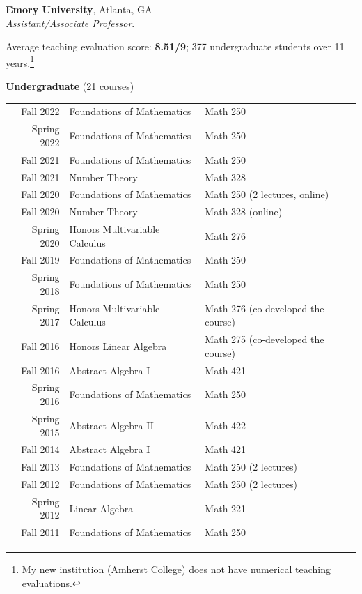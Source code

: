 \documentclass[margin,line]{res}
\newcommand{\defi}[1]{\textsf{#1}} 				%
\begin{document}
\begin{resume}
{\bf Emory University}, Atlanta, GA\\
\emph{Assistant/Associate Professor}. 
\vspace{2pt}

Average teaching evaluation score: \textbf{8.51/9}; 377 undergraduate students over 11 years.\footnote{My new institution (Amherst College) does not have numerical teaching evaluations.} 
\vspace{2pt}



{\bf Undergraduate} (21 courses)
\vspace*{-.1in}

\begin{tabular}{rll}
 Fall 2022 & \defi{Foundations of Mathematics} & Math 250\\  
 Spring 2022 & \defi{Foundations of Mathematics} & Math 250\\
 Fall 2021 & \defi{Foundations of Mathematics} & Math 250  \\
 Fall 2021 & \defi{Number Theory} & Math 328   \\   
 Fall 2020 & \defi{Foundations of Mathematics} & Math 250 (2 lectures, online) \\
 Fall 2020 & \defi{Number Theory} & Math 328 (online)  \\    
 Spring 2020 & \defi{Honors Multivariable Calculus} & Math 276 \\
 Fall 2019 & \defi{Foundations of Mathematics} & Math 250 \\
 Spring 2018 & \defi{Foundations of Mathematics} & Math 250 \\
 Spring 2017 & \defi{Honors Multivariable Calculus} & Math 276  (co-developed the course) \\
 Fall 2016 & \defi{Honors Linear Algebra} & Math 275 (co-developed the course) \\
 Fall 2016 & \defi{Abstract Algebra I} & Math 421 \\
 Spring 2016 & \defi{Foundations of Mathematics} & Math 250 \\
 Spring 2015 & \defi{Abstract Algebra II} & Math 422 \\
 Fall 2014 & \defi{Abstract Algebra I} & Math 421 \\
 Fall 2013 & \defi{Foundations of Mathematics} & Math 250 (2 lectures) \\
 Fall 2012 & \defi{Foundations of Mathematics} & Math 250 (2 lectures) \\
 Spring 2012 & \defi{Linear Algebra} & Math 221 \\
 Fall 2011 & \defi{Foundations of Mathematics} & Math 250 \\
\end{tabular}


\end{resume}
\end{document}
